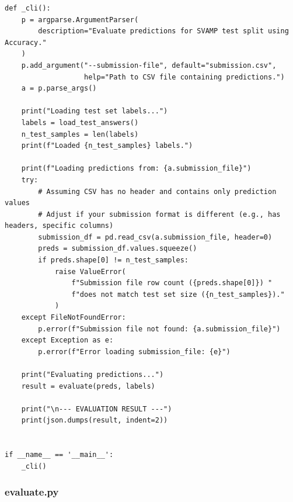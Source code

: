 \documentclass{fairmeta}
\begin{document}
\begin{lstlisting}
def _cli():
    p = argparse.ArgumentParser(
        description="Evaluate predictions for SVAMP test split using Accuracy."
    )
    p.add_argument("--submission-file", default="submission.csv",
                   help="Path to CSV file containing predictions.")
    a = p.parse_args()

    print("Loading test set labels...")
    labels = load_test_answers()
    n_test_samples = len(labels)
    print(f"Loaded {n_test_samples} labels.")

    print(f"Loading predictions from: {a.submission_file}")
    try:
        # Assuming CSV has no header and contains only prediction values
        # Adjust if your submission format is different (e.g., has headers, specific columns)
        submission_df = pd.read_csv(a.submission_file, header=0)
        preds = submission_df.values.squeeze()
        if preds.shape[0] != n_test_samples:
            raise ValueError(
                f"Submission file row count ({preds.shape[0]}) "
                f"does not match test set size ({n_test_samples})."
            )
    except FileNotFoundError:
        p.error(f"Submission file not found: {a.submission_file}")
    except Exception as e:
        p.error(f"Error loading submission_file: {e}")

    print("Evaluating predictions...")
    result = evaluate(preds, labels)

    print("\n--- EVALUATION RESULT ---")
    print(json.dumps(result, indent=2))


if __name__ == '__main__':
    _cli()
\end{lstlisting}

\subsubsection{evaluate.py}
\label{app:evaluate.py}
\end{document}
